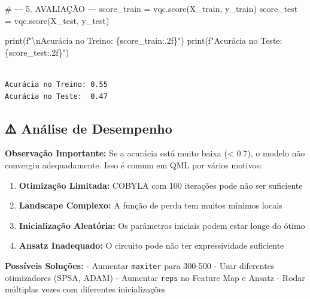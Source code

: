 \documentclass[
  brazilian,
]{report}
\newenvironment{Shaded}{\begin{snugshade}}{\end{snugshade}}
\newcommand{\NormalTok}[1]{\textcolor[rgb]{0.00,0.23,0.31}{#1}}
\providecommand{\tightlist}{%
  \setlength{\itemsep}{0pt}\setlength{\parskip}{0pt}}
\begin{document}
\begin{Shaded}
\begin{Highlighting}[]


\NormalTok{\# {-}{-}{-} 5. AVALIAÇÃO {-}{-}{-}}
\NormalTok{score\_train = vqc.score(X\_train, y\_train)}
\NormalTok{score\_test = vqc.score(X\_test, y\_test)}

\NormalTok{print(f"\textbackslash{}nAcurácia no Treino: \{score\_train:.2f\}")}
\NormalTok{print(f"Acurácia no Teste:  \{score\_test:.2f\}")}
\end{Highlighting}
\end{Shaded}

\begin{verbatim}

Acurácia no Treino: 0.55
Acurácia no Teste:  0.47
\end{verbatim}

\subsection{⚠️ Análise de Desempenho}\label{anuxe1lise-de-desempenho}

\textbf{Observação Importante:} Se a acurácia está muito baixa
(\textless{} 0.7), o modelo não convergiu adequadamente. Isso é comum em
QML por vários motivos:

\begin{enumerate}
\def\labelenumi{\arabic{enumi}.}
\tightlist
\item
  \textbf{Otimização Limitada:} COBYLA com 100 iterações pode não ser
  suficiente
\item
  \textbf{Landscape Complexo:} A função de perda tem muitos mínimos
  locais
\item
  \textbf{Inicialização Aleatória:} Os parâmetros iniciais podem estar
  longe do ótimo
\item
  \textbf{Ansatz Inadequado:} O circuito pode não ter expressividade
  suficiente
\end{enumerate}

\textbf{Possíveis Soluções:} - Aumentar \texttt{maxiter} para 300-500 -
Usar diferentes otimizadores (SPSA, ADAM) - Aumentar \texttt{reps} no
Feature Map e Ansatz - Rodar múltiplas vezes com diferentes
inicializações
\end{document}
